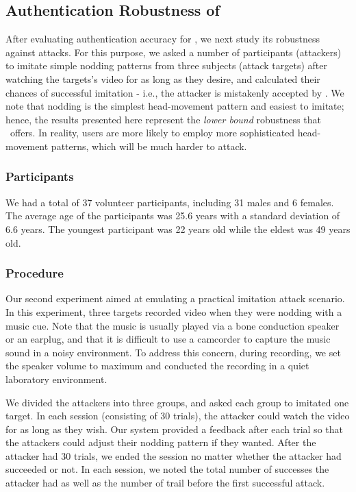 \subsection{Authentication Robustness of \systemname} After evaluating authentication accuracy for \systemname, we next study its robustness against attacks. For this purpose, we asked a number of participants (attackers) to imitate simple nodding patterns from three subjects (attack targets) after watching the targets's video for as long as they desire, and calculated their chances of successful imitation - i.e., the attacker is mistakenly accepted by \systemname. We note that nodding is the simplest head-movement pattern and easiest to imitate; hence, the results presented here represent the \emph{lower bound} robustness that \systemname~offers. In reality, users are more likely to employ more sophisticated head-movement patterns, which will be much harder to attack.

\subsubsection{Participants}
We had a total of 37 volunteer participants, including 31 males and 6 females. The average age of the participants was 25.6 years with a standard deviation
of 6.6 years. The youngest participant was 22 years old while the eldest was 49 years old.

\subsubsection{Procedure}
Our second experiment aimed at emulating a practical imitation attack scenario. In this experiment, three targets recorded video when they were nodding with a music cue. Note that the music is usually played via a bone conduction speaker or an earplug, and that it is difficult to use a camcorder to capture the music sound in a noisy environment. To address this concern, during recording, we set the speaker volume to maximum and conducted the recording in a quiet laboratory environment.

We divided the attackers into three groups, and asked each group to imitated one target. In each session (consisting of 30 trials), the attacker could watch the video for as long as they wish. Our system provided a feedback after each trial so that the attackers could adjust their nodding pattern if they wanted. After the attacker had 30 trials,
we ended the session no matter whether the attacker had succeeded or not. In each session, we noted the total number of successes the attacker had as well as the number of trail before the first successful attack. %

